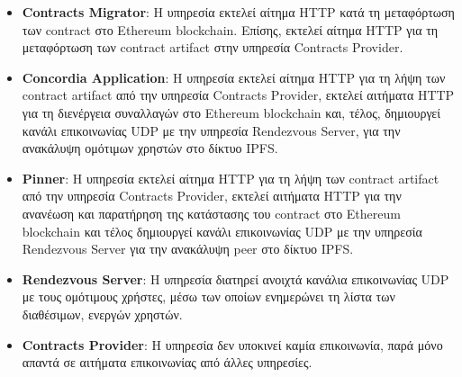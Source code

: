 \begin{itemize}
    \item \textbf{Contracts Migrator}: Η υπηρεσία εκτελεί αίτημα HTTP κατά τη μεταφόρτωση των \textenglish{contract} στο Ethereum blockchain. Eπίσης, εκτελεί αίτημα HTTP για τη μεταφόρτωση των \textenglish{contract artifact} στην υπηρεσία Contracts Provider.

    \item \textbf{Concordia Application}: Η υπηρεσία εκτελεί αίτημα HTTP για τη λήψη των \textenglish{contract artifact} από την υπηρεσία Contracts Provider, εκτελεί αιτήματα HTTP για τη διενέργεια συναλλαγών στο Ethereum blockchain και, τέλος, δημιουργεί κανάλι επικοινωνίας UDP με την υπηρεσία Rendezvous Server, για την ανακάλυψη ομότιμων χρηστών στο δίκτυο IPFS.

    \item \textbf{Pinner}: Η υπηρεσία εκτελεί αίτημα HTTP για τη λήψη των \textenglish{contract artifact} από την υπηρεσία Contracts Provider, εκτελεί αιτήματα HTTP για την ανανέωση και παρατήρηση της κατάστασης του contract στο Ethereum blockchain και τέλος δημιουργεί κανάλι επικοινωνίας UDP με την υπηρεσία Rendezvous Server για την ανακάλυψη peer στο δίκτυο IPFS.

    \item \textbf{Rendezvous Server}: Η υπηρεσία διατηρεί ανοιχτά κανάλια επικοινωνίας UDP με τους ομότιμους χρήστες, μέσω των οποίων ενημερώνει τη λίστα των διαθέσιμων, ενεργών χρηστών.

    \item \textbf{Contracts Provider}: Η υπηρεσία δεν υποκινεί καμία επικοινωνία, παρά μόνο απαντά σε αιτήματα επικοινωνίας από άλλες υπηρεσίες.
\end{itemize}